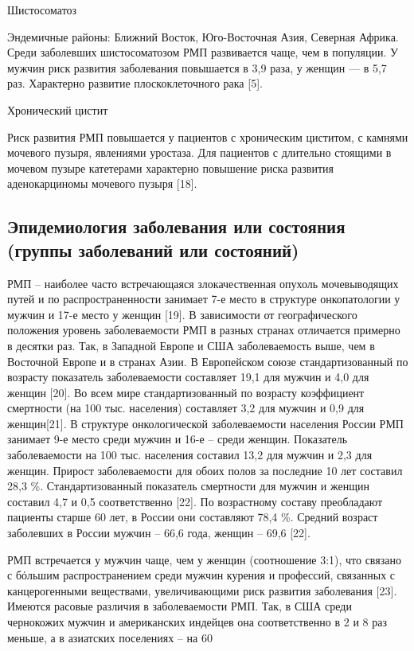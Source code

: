 Шистосоматоз

Эндемичные районы: Ближний Восток, Юго-Восточная Азия, Северная Африка. Среди заболевших шистосоматозом РМП развивается чаще, чем в популяции. У мужчин риск развития заболевания повышается в 3,9 раза, у женщин — в 5,7 раз. Характерно развитие плоскоклеточного рака [5]. 

Хронический цистит

Риск развития РМП повышается у пациентов с хроническим циститом, с камнями мочевого пузыря, явлениями уростаза. Для пациентов с длительно стоящими в мочевом пузыре катетерами характерно повышение риска развития аденокарциномы мочевого пузыря [18].

\subsection{Эпидемиология заболевания или состояния (группы заболеваний или состояний)}
\label{sec:}
РМП – наиболее часто встречающаяся злокачественная опухоль мочевыводящих путей и по распространенности занимает 7-е место в структуре онкопатологии у мужчин и 17-е место у женщин [19]. В зависимости от географического положения уровень заболеваемости РМП в разных странах отличается примерно в десятки раз. Так, в Западной Европе и США заболеваемость выше, чем в Восточной Европе и в странах Азии. В Европейском союзе стандартизованный по возрасту показатель заболеваемости составляет 19,1 для мужчин и 4,0 для женщин [20]. Во всем мире стандартизованный по возрасту коэффициент смертности (на 100 тыс. населения) составляет 3,2 для мужчин и 0,9 для женщин[21]. В структуре онкологической заболеваемости населения России РМП занимает 9-е место среди мужчин и 16-е – среди женщин. Показатель заболеваемости на 100 тыс. населения составил 13,2 для мужчин и 2,3 для женщин. Прирост заболеваемости для обоих полов за последние 10 лет составил 28,3 \%. Стандартизованный показатель смертности для мужчин и женщин составил 4,7 и 0,5 соответственно [22]. По возрастному составу преобладают пациенты старше 60 лет, в России они составляют 78,4 \%. Средний возраст заболевших в России мужчин – 66,6 года, женщин – 69,6 [22].

РМП встречается у мужчин чаще, чем у женщин (соотношение 3:1), что связано с бόльшим распространением среди мужчин курения и профессий, связанных с канцерогенными веществами, увеличивающими риск развития заболевания [23]. Имеются расовые различия в заболеваемости РМП. Так, в США среди чернокожих мужчин и американских индейцев она соответственно в 2 и 8 раз меньше, а в азиатских поселениях – на 60 %

